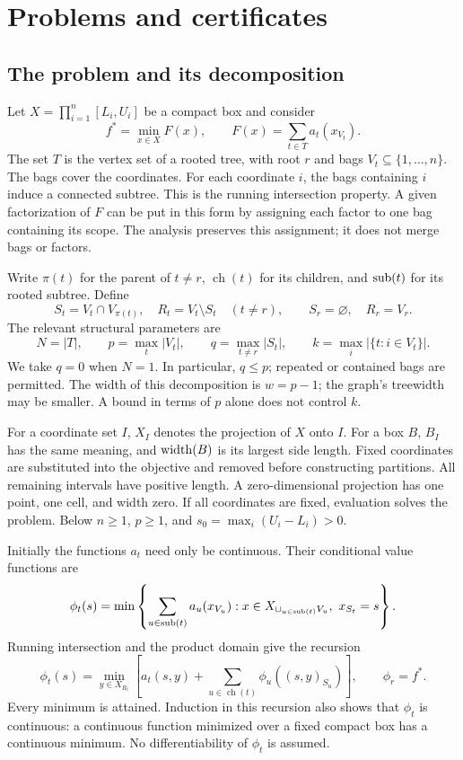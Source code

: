 \section{Problems and certificates}\label{sec:model}

\subsection{The problem and its decomposition}
Let $X=\prod_{i=1}^n[L_i,U_i]$ be a compact box and consider
\begin{equation}\label{eq:model-problem}
 f^*=\min_{x\in X}F(x),\qquad
 F(x)=\sum_{t\in T}a_t(x_{V_t}).
\end{equation}
The set $T$ is the vertex set of a rooted tree, with root $r$ and bags
$V_t\subseteq\{1,\ldots,n\}$. The bags cover the coordinates. For each
coordinate $i$, the bags containing $i$ induce a connected subtree. This
is the running intersection property. A given factorization of $F$ can be
put in this form by assigning each factor to one bag containing its scope.
The analysis preserves this assignment; it does not merge bags or factors.

Write $\pi(t)$ for the parent of $t\ne r$, $\operatorname{ch}(t)$ for its
children, and $\operatorname{sub}(t)$ for its rooted subtree. Define
\[
 S_t=V_t\cap V_{\pi(t)},\quad R_t=V_t\setminus S_t\quad(t\ne r),
 \qquad S_r=\varnothing,\quad R_r=V_r.
\]
The relevant structural parameters are
\[
 N=|T|,\qquad p=\max_t|V_t|,\qquad
 q=\max_{t\ne r}|S_t|,\qquad
 k=\max_i|\{t:i\in V_t\}|.
\]
We take $q=0$ when $N=1$. In particular, $q\le p$; repeated or contained
bags are permitted. The width of this decomposition is $w=p-1$; the
graph's treewidth may be smaller. A bound in terms of $p$ alone does not
control $k$.

For a coordinate set $I$, $X_I$ denotes the projection of $X$ onto $I$.
For a box $B$, $B_I$ has the same meaning, and $\operatorname{width}(B)$ is its largest
side length. Fixed coordinates are substituted into the objective and
removed before constructing partitions. All remaining intervals have
positive length. A zero-dimensional projection has one point, one cell,
and width zero. If all coordinates are fixed, evaluation solves the problem.
Below $n\ge1$, $p\ge1$, and $s_0=\max_i(U_i-L_i)>0$.

Initially the functions $a_t$ need only be continuous. Their conditional
value functions are
\[
 \phi_t(s)=\min\left\{\sum_{u\in\operatorname{sub}(t)}a_u(x_{V_u}):
 x\in X_{\cup_{u\in\operatorname{sub}(t)}V_u},\ x_{S_t}=s\right\}.
\]
Running intersection and the product domain give the recursion
\begin{equation}\label{eq:model-value}
 \phi_t(s)=\min_{y\in X_{R_t}}
 \left[a_t(s,y)+\sum_{u\in\operatorname{ch}(t)}\phi_u((s,y)_{S_u})\right],
 \qquad \phi_r=f^*.
\end{equation}
Every minimum is attained. Induction in this recursion also shows that
$\phi_t$ is continuous: a continuous function minimized over a fixed compact
box has a continuous minimum. No differentiability of $\phi_t$ is assumed.

